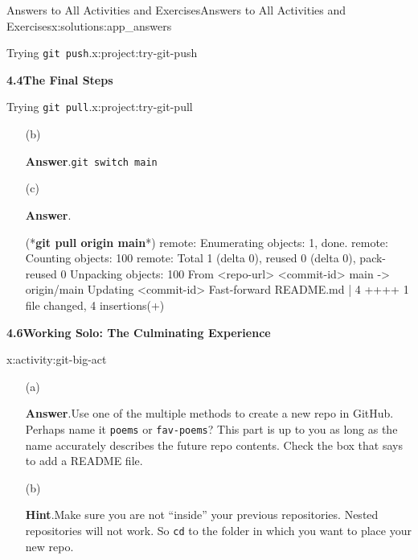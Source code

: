 \documentclass[oneside,10pt,]{book}
\newcommand{\blocktitlefont}{\relax}
\newcommand{\mono}[1]{\texttt{#1}}
\newcommand{\consoleinput}[1]{\textbf{#1}}
\begin{document}
\begin{solutions-chapter}{Answers to All Activities and Exercises}{}{Answers to All Activities and Exercises}{}{}{x:solutions:app_answers}
\begin{projectsolution}{4.7}{Trying \mono{git push}.}{x:project:try-git-push}
\begin{enumerate}[font=\bfseries,label=(\alph*),ref=\alph*]
\begin{enumerate}[font=\bfseries,label=(\roman*),ref=\theenumi.\roman*]
\end{enumerate}
\end{enumerate}
\end{projectsolution}%
\par\medskip
\noindent\textbf{\Large{}4.4\space\textperiodcentered\space{}The Final Steps}
\begin{projectsolution}{4.10}{Trying \mono{git pull}.}{x:project:try-git-pull}%
\begin{enumerate}[font=\bfseries,label=(\alph*),ref=\alph*]
\item[(b)]\par\smallskip%
\noindent\textbf{\blocktitlefont Answer}.\hypertarget{g:answer:idm479721048-back}{}\quad{}\mono{git switch main}%
\item[(c)]\par\smallskip%
\noindent\textbf{\blocktitlefont Answer}.\hypertarget{g:answer:idm479720024-back}{}\quad{}\begin{console}{0}{1}{0}
(*\consoleinput{git pull origin main}*)
remote: Enumerating objects: 1, done.
remote: Counting objects: 100%
remote: Total 1 (delta 0), reused 0 (delta 0), pack-reused 0
Unpacking objects: 100%
From <repo-url>
   <commit-id>  main       -> origin/main
Updating <commit-id>
Fast-forward
 README.md | 4 ++++
 1 file changed, 4 insertions(+)
\end{console}
\end{enumerate}
\end{projectsolution}%
\par\medskip
\noindent\textbf{\Large{}4.6\space\textperiodcentered\space{}Working Solo: The Culminating Experience}
\begin{activitysolution}{4.11}{}{x:activity:git-big-act}%
\begin{enumerate}[font=\bfseries,label=(\alph*),ref=\alph*]
\item[(a)]\par\smallskip%
\noindent\textbf{\blocktitlefont Answer}.\hypertarget{g:answer:idm479680088-back}{}\quad{}Use one of the multiple methods to create a new repo in GitHub. Perhaps name it \mono{poems} or \mono{fav-poems}? This part is up to you as long as the name accurately describes the future repo contents. Check the box that says to add a README file.%
\item[(b)]\par\smallskip%
\noindent\textbf{\blocktitlefont Hint}.\hypertarget{g:hint:idm479678936-back}{}\quad{}Make sure you are not ``inside'' your previous repositories. Nested repositories will not work. So \mono{cd} to the folder in which you want to place your new repo.%

\end{enumerate}
\end{activitysolution}
\end{solutions-chapter}
\end{document}
